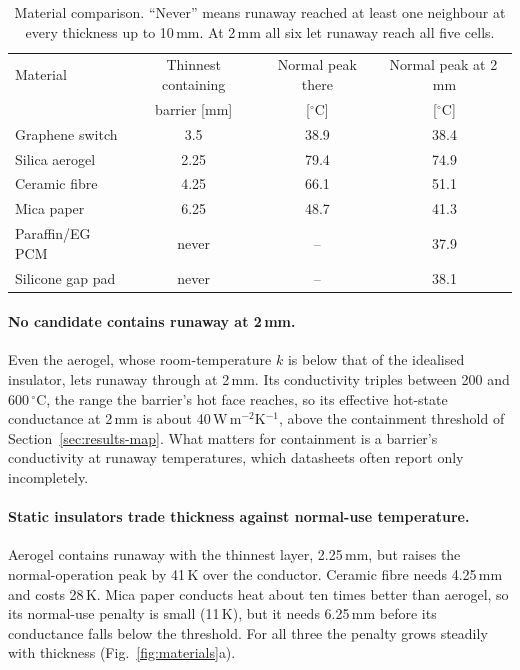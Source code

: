 \documentclass[11pt]{article}
\begin{document}
\begin{table}[!htbp]
  \centering\small
  \caption{Material comparison. ``Never'' means runaway reached at least one neighbour at
  every thickness up to 10\,mm. At 2\,mm all six let runaway reach all five cells.}
  \label{tab:matresults}
  \begin{tabular}{@{}lccc@{}}
    \toprule
    Material & Thinnest containing & Normal peak there & Normal peak at 2\,mm \\
             & barrier [mm] & [$^\circ$C] & [$^\circ$C] \\
    \midrule
    Graphene switch  & 3.5   & 38.9 & 38.4 \\
    Silica aerogel   & 2.25  & 79.4 & 74.9 \\
    Ceramic fibre    & 4.25  & 66.1 & 51.1 \\
    Mica paper       & 6.25  & 48.7 & 41.3 \\
    Paraffin/EG PCM  & never & --   & 37.9 \\
    Silicone gap pad & never & --   & 38.1 \\
    \bottomrule
  \end{tabular}
\end{table}

\paragraph{No candidate contains runaway at 2\,mm.} Even the aerogel, whose room-temperature
$k$ is below that of the idealised insulator, lets runaway through at 2\,mm. Its
conductivity triples between 200 and 600\,$^\circ$C, the range the barrier's hot face
reaches, so its effective hot-state conductance at 2\,mm is about 40\,W\,m$^{-2}$K$^{-1}$,
above the containment threshold of Section~\ref{sec:results-map}. What matters for
containment is a barrier's conductivity at runaway temperatures, which datasheets often
report only incompletely.

\paragraph{Static insulators trade thickness against normal-use temperature.} Aerogel
contains runaway with the thinnest layer, 2.25\,mm, but raises the normal-operation peak by
41\,K over the conductor. Ceramic fibre needs 4.25\,mm and costs 28\,K. Mica paper conducts
heat about ten times better than aerogel, so its normal-use penalty is small (11\,K), but
it needs 6.25\,mm before its conductance falls below the threshold. For all three the
penalty grows steadily with thickness (Fig.~\ref{fig:materials}a).
\end{document}

